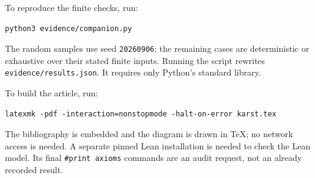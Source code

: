 \documentclass[11pt,letterpaper]{article}
\newcommand{\code}[1]{\nolinkurl{#1}}
\theoremstyle{remark}
\begin{document}
To reproduce the finite checks, run:
\begin{lstlisting}
python3 evidence/companion.py
\end{lstlisting}
The random samples use seed \code{20260906}; the remaining cases are deterministic
or exhaustive over their stated finite inputs. Running the script rewrites
\code{evidence/results.json}. It requires only Python's standard library.

To build the article, run:
\begin{lstlisting}
latexmk -pdf -interaction=nonstopmode -halt-on-error karst.tex
\end{lstlisting}
The bibliography is embedded and the diagram is drawn in TeX; no network
access is needed. A separate pinned Lean installation is needed to check the
Lean model. Its final \code{\#print axioms} commands are an audit request, not
an already recorded result.
\end{document}

